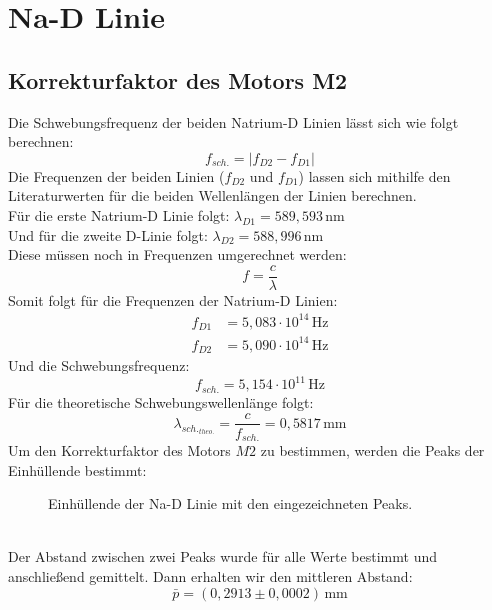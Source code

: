 \section{Na-D Linie}
\subsection{Korrekturfaktor des Motors M2}
Die Schwebungsfrequenz der beiden Natrium-D Linien lässt sich wie folgt berechnen:
\begin{equation}
    f_{sch.}=\left|f_{D2}-f_{D1}\right|
\end{equation}
Die Frequenzen der beiden Linien ($f_{D2}$ und $f_{D1}$) lassen sich mithilfe den Literaturwerten für die beiden Wellenlängen der Linien berechnen.\\
Für die erste Natrium-D Linie folgt: $\lambda_{D1}=589,593\,\text{nm}$\\
Und für die zweite D-Linie folgt: $\lambda_{D2}=588,996\,\text{nm}$\\
Diese müssen noch in Frequenzen umgerechnet werden:
\begin{equation}
    f=\frac{c}{\lambda}
\end{equation}
Somit folgt für die Frequenzen der Natrium-D Linien:
\begin{align}
    f_{D1}&=5,083\cdot10^{14}\,\text{Hz}\\
    f_{D2}&=5,090\cdot10^{14}\,\text{Hz}
\end{align}
Und die Schwebungsfrequenz:
\begin{equation}
    f_{sch.}=5,154\cdot10^{11}\,\text{Hz}
\end{equation}
Für die theoretische Schwebungswellenlänge folgt:
\begin{equation}
    \lambda_{{sch.}_{theo.}}=\frac{c}{f_{sch.}}=0,5817\,\text{mm}
\end{equation}\newpage
Um den Korrekturfaktor des Motors $M2$ zu bestimmen, werden die Peaks der Einhüllende bestimmt:
\begin{figure}[h]
    \centering\scalebox{0.8}{}
    \caption{Einhüllende der Na-D Linie mit den eingezeichneten Peaks.}
\end{figure}\\
Der Abstand zwischen zwei Peaks wurde für alle Werte bestimmt und anschließend gemittelt.
Dann erhalten wir den mittleren Abstand:
\begin{equation}
    \bar{p}=\left(0,2913\pm0,0002\right)\,\text{mm}
\end{equation}
